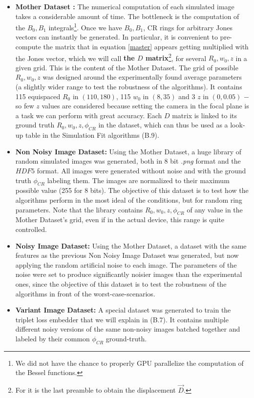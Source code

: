 \documentclass[11pt, a4paper, twoside]{article} %
\begin{document}
\begin{itemize}
\item {\bf Mother Dataset :} The numerical computation of each simulated image takes a considerable amount of time. The bottleneck is the computation of the $B_0,B_1$ integrals\footnote{We did not have the chance to properly GPU parallelize the computation of the Bessel functions.}. Once we have $B_0,B_1$, CR rings for arbitrary Jones vectors can instantly be generated. In particular, it is convenient to pre-compute the matrix that in equation \eqref{master} appears getting multiplied with the Jones vector, which we will call {\bf the $D$ matrix}\footnote{For it is the last preamble to obtain the displacement $\vec{D}$.}, for several $R_0,w_0,z$ in a given grid. This is the content of the Mother Dataset. The grid of possible $R_0,w_0,z$ was designed around the experimentally found average parameters (a slightly wider range to test the robustness of the algorithms). It contains 115 equispaced $R_0$ in $(110,180)$, 115 $w_0$ in $(8,35)$ and 3 $z$ in $(0,0.05)$ $-$ so few $z$ values are considered because setting the camera in the focal plane is a task we can perform with great accuracy. Each $D$ matrix is linked to its ground truth $R_0,w_0,z,\phi_{CR}$ in the dataset, which can thus be used as a look-up table in the Simulation Fit algorithms (B.9).

\item {\bf Non Noisy Image Dataset:} Using the Mother Dataset, a huge library of random simulated images was generated, both in 8 bit {\em .png} format and the $HDF5$ format. All images were generated without noise and with the ground truth $\phi_{CR}$ labeling them. The images are normalized to their maximum possible value (255 for 8 bits). The objective of this dataset is to test how the algorithms perform in the most ideal of the conditions, but for random ring parameters. Note that the library contains $R_0,w_0,z,\phi_{CR}$ of any value in the Mother Dataset's grid, even if in the actual device, this range is quite controlled. 

\item {\bf Noisy Image Dataset:} Using the Mother Dataset, a dataset with the same features as the previous Non Noisy Image Dataset was generated, but now applying the random artificial noise to each image. The parameters of the noise were set to produce significantly noisier images than the experimental ones, since the objective of this dataset is to test the robustness of the algorithms in front of the worst-case-scenarios.

\item {\bf Variant Image Dataset:} A special dataset was generated to train the triplet loss embedder that we will explain in (B.7). It contains multiple different noisy versions of the same non-noisy images batched together and labeled by their common $\phi_{CR}$ ground-truth.\vspace{-0.3cm}
\end{itemize}
\end{document}
